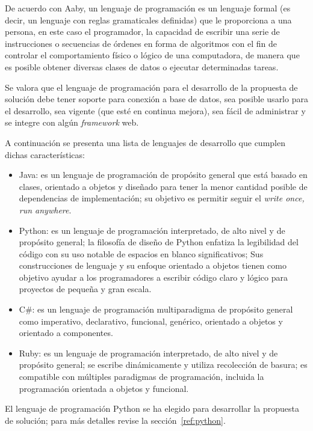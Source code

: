 De acuerdo con Aaby\cite{aaby_introduction_1996}, un lenguaje de programación es un lenguaje formal (es decir, un lenguaje con reglas gramaticales definidas) que le proporciona a una persona, en este caso el programador, la capacidad de escribir una serie de instrucciones o secuencias de órdenes en forma de algoritmos con el fin de controlar el comportamiento físico o lógico de una computadora, de manera que es posible obtener diversas clases de datos o ejecutar determinadas tareas.


Se valora que el lenguaje de programación para el desarrollo de la propuesta de solución debe tener soporte para conexión a base de datos, sea posible usarlo para el desarrollo, sea vigente (que esté en continua mejora), sea fácil de administrar y se integre con algún \textit{framework} web.


A continuación se presenta una lista de lenguajes de desarrollo que cumplen dichas características:

\begin{itemize}
    \item Java: es un lenguaje de programación de propósito general que está basado en clases, orientado a objetos y diseñado para tener la menor cantidad posible de dependencias de implementación; su objetivo es permitir seguir el  \textit{write once, run anywhere}\cite{joy_java_2000}.
    \item Python: es un lenguaje de programación interpretado, de alto nivel y de propósito general; la filosofía de diseño de Python enfatiza la legibilidad del código con su uso notable de espacios en blanco significativos; Sus construcciones de lenguaje y su enfoque orientado a objetos tienen como objetivo ayudar a los programadores a escribir código claro y lógico para proyectos de pequeña y gran escala\cite{van_rossum_python_2007}.
    \item C\#: es un lenguaje de programación multiparadigma de propósito general como imperativo, declarativo, funcional, genérico, orientado a objetos y orientado a componentes\cite{hejlsberg_c_2003}.
    \item Ruby: es un lenguaje de programación interpretado, de alto nivel y de propósito general; se escribe dinámicamente y utiliza recolección de basura; es compatible con múltiples paradigmas de programación, incluida la programación orientada a objetos y funcional\cite{flanagan_ruby_2008}.
\end{itemize}

El lenguaje de programación Python se ha elegido para desarrollar la propuesta de solución; para más detalles revise la sección~\ref{ref:python}.

